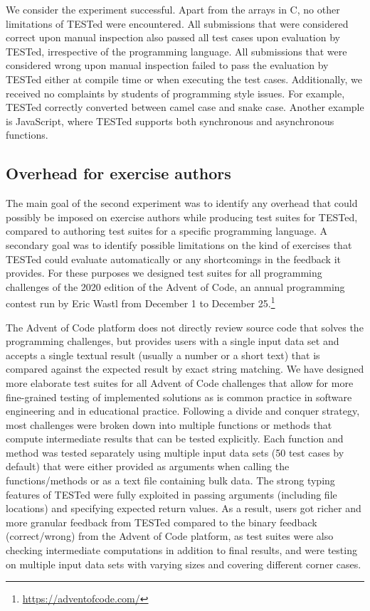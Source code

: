 \documentclass[../main]{subfiles}
\begin{document}
We consider the experiment successful.
Apart from the arrays in C, no other limitations of TESTed were encountered.
All submissions that were considered correct upon manual inspection also passed all test cases upon evaluation by TESTed, irrespective of the programming language.
All submissions that were considered wrong upon manual inspection failed to pass the evaluation by TESTed either at compile time or when executing the test cases.
Additionally, we received no complaints by students of programming style issues.
For example, TESTed correctly converted between camel case and snake case.
Another example is JavaScript, where TESTed supports both synchronous and asynchronous functions.

\subsection{Overhead for exercise authors}\label{subsec:overhead-for-exercise-designers}

The main goal of the second experiment was to identify any overhead that could possibly be imposed on exercise authors while producing test suites for TESTed, compared to authoring test suites for a specific programming language.
A secondary goal was to identify possible limitations on the kind of exercises that TESTed could evaluate automatically or any shortcomings in the feedback it provides.
For these purposes we designed test suites for all programming challenges of the 2020 edition of the Advent of Code, an annual programming contest run by Eric Wastl from December 1 to December 25.\footnote{\url{https://adventofcode.com/}}

The Advent of Code platform does not directly review source code that solves the programming challenges, but provides users with a single input data set and accepts a single textual result (usually a number or a short text) that is compared against the expected result by exact string matching.
We have designed more elaborate test suites for all Advent of Code challenges that allow for more fine-grained testing of implemented solutions as is common practice in software engineering and in educational practice.
Following a divide and conquer strategy, most challenges were broken down into multiple functions or methods that compute intermediate results that can be tested explicitly.
Each function and method was tested separately using multiple input data sets (50 test cases by default) that were either provided as arguments when calling the functions/methods or as a text file containing bulk data.
The strong typing features of TESTed were fully exploited in passing arguments (including file locations) and specifying expected return values.
As a result, users got richer and more granular feedback from TESTed compared to the binary feedback (correct/wrong) from the Advent of Code platform, as test suites were also checking intermediate computations in addition to final results, and were testing on multiple input data sets with varying sizes and covering different corner cases.
\end{document}
